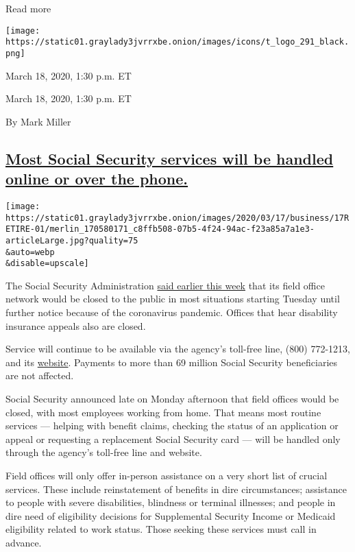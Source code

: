 Read more

\texttt{[image: https://static01.graylady3jvrrxbe.onion/images/icons/t\_logo\_291\_black.png]}

March 18, 2020, 1:30 p.m. ET

March 18, 2020, 1:30 p.m. ET

By Mark Miller

\hypertarget{most-social-security-services-will-be-handled-online-or-over-the-phone}{%
\subsection{\texorpdfstring{\protect\hyperlink{most-social-security-services-will-be-handled-online-or-over-the-phone}{Most
Social Security services will be handled online or over the
phone.}}{Most Social Security services will be handled online or over the phone.}}\label{most-social-security-services-will-be-handled-online-or-over-the-phone}}

\texttt{[image: https://static01.graylady3jvrrxbe.onion/images/2020/03/17/business/17RETIRE-01/merlin\_170580171\_c8ffb508-07b5-4f24-94ac-f23a85a7a1e3-articleLarge.jpg?quality=75\\\&auto=webp\\\&disable=upscale]}

The Social Security Administration
\href{https://www.ssa.gov/news/press/releases/2020/\#3-2020-2}{said
earlier this week} that its field office network would be closed to the
public in most situations starting Tuesday until further notice because
of the coronavirus pandemic. Offices that hear disability insurance
appeals also are closed.

Service will continue to be available via the agency's toll-free line,
(800) 772-1213, and its
\href{https://www.ssa.gov/onlineservices/}{website}. Payments to more
than 69 million Social Security beneficiaries are not affected.

Social Security announced late on Monday afternoon that field offices
would be closed, with most employees working from home. That means most
routine services --- helping with benefit claims, checking the status of
an application or appeal or requesting a replacement Social Security
card --- will be handled only through the agency's toll-free line and
website.

Field offices will only offer in-person assistance on a very short list
of crucial services. These include reinstatement of benefits in dire
circumstances; assistance to people with severe disabilities, blindness
or terminal illnesses; and people in dire need of eligibility decisions
for Supplemental Security Income or Medicaid eligibility related to work
status. Those seeking these services must call in advance.

